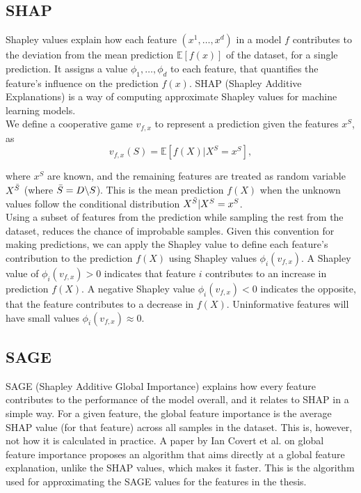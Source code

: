 \subsection{SHAP}
Shapley values explain how each feature $(x^1, \dots, x^d)$ in a model $f$ contributes to the deviation from the mean prediction $\mathbb{E}[f(x)]$ of the dataset, for a single prediction.
It assigns a value $\phi_1, \dots, \phi_d$ to each feature, that quantifies the feature's influence on the prediction $f(x)$.
SHAP (Shapley Additive Explanations) is a way of computing approximate Shapley values for machine learning models.\\

We define a cooperative game $v_{f,x}$ to represent a prediction given the features $x^S$, as
\begin{equation}
    v_{f,x}(S) = \mathbb{E} \left[ f(X) | X^S = x^S \right],
\end{equation}

where $x^S$ are known, and the remaining features are treated as random variable $X^{\Bar{S}}$ (where $\Bar{S} = D \backslash S$).
This is the mean prediction $f(X)$ when the unknown values follow the conditional distribution $X^{\Bar{S}} | X^S = x^S$.\\

Using a subset of features from the prediction while sampling the rest from the dataset, reduces the chance of improbable samples.
Given this convention for making predictions, we can apply the Shapley value to define each feature's contribution to the prediction $f(X)$ using Shapley values $\phi_i(v_{f,x})$.
A Shapley value of $\phi_i(v_{f,x}) > 0$ indicates that feature $i$ contributes to an increase in prediction $f(X)$.
A negative Shapley value $\phi_i(v_{f,x}) < 0$ indicates the opposite, that the feature contributes to a decrease in $f(X)$.
Uninformative features will have small values $\phi_i(v_{f,x}) \approx 0$.

\subsection{SAGE}
SAGE (Shapley Additive Global Importance) explains how every feature contributes to the performance of the model overall, and it relates to SHAP in a simple way.
For a given feature, the global feature importance is the average SHAP value (for that feature) across all samples in the dataset.
This is, however, not how it is calculated in practice.
A paper by Ian Covert et al.
\cite{sage_paper} on global feature importance proposes an algorithm that aims directly at a global feature explanation, unlike the SHAP values, which makes
it faster.
This is the algorithm used for approximating the SAGE values for the features in the thesis.

